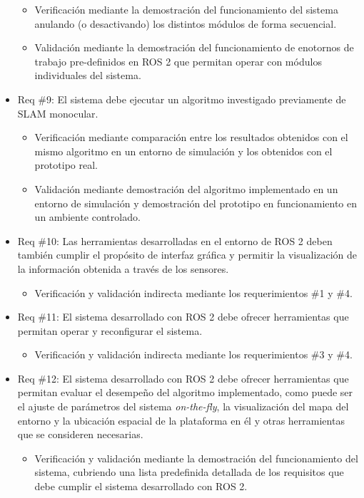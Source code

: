\documentclass[
11pt, %
codirector, %
]{charter}
\begin{document}
\begin{itemize}
\begin{itemize}
		\item Verificación mediante la demostración del funcionamiento del sistema anulando (o desactivando) los distintos módulos de forma secuencial.
		\item Validación mediante la demostración del funcionamiento de enotornos de trabajo pre-definidos en ROS 2 que permitan operar con módulos individuales del sistema. 
	\end{itemize}
	\item Req \#9: El sistema debe ejecutar un algoritmo investigado previamente de SLAM monocular.
	\begin{itemize}
		\item Verificación mediante comparación entre los resultados obtenidos con el mismo algoritmo en un entorno de simulación y los obtenidos con el prototipo real.
		\item Validación mediante demostración del algoritmo implementado en un entorno de simulación y demostración del prototipo en funcionamiento en un ambiente controlado.
	\end{itemize}
	\item Req \#10: Las herramientas desarrolladas en el entorno de ROS 2 deben también cumplir el propósito de interfaz gráfica y permitir la visualización de la información obtenida a través de los sensores.
	\begin{itemize}
		\item Verificación y validación indirecta mediante los requerimientos \#1 y \#4.
	\end{itemize}
	\item Req \#11: El sistema desarrollado con ROS 2 debe ofrecer herramientas que permitan operar y reconfigurar el sistema.
	\begin{itemize}
		\item Verificación y validación indirecta mediante los requerimientos \#3 y \#4.
	\end{itemize}
	\item Req \#12: El sistema desarrollado con ROS 2 debe ofrecer herramientas que permitan evaluar el desempeño del algoritmo implementado, como puede ser el ajuste de parámetros del sistema \textit{on-the-fly}, la visualización del mapa del entorno y la ubicación espacial de la plataforma en él y otras herramientas que se consideren necesarias.
	\begin{itemize}
		\item Verificación y validación mediante la demostración del funcionamiento del sistema, cubriendo una lista predefinida detallada de los requisitos que debe cumplir el sistema desarrollado con ROS 2.
	\end{itemize}
\end{itemize}
\end{document}
